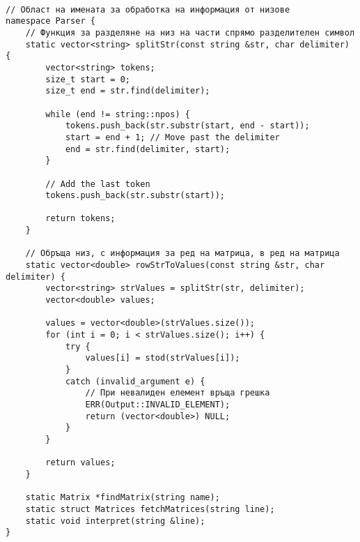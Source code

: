 \documentclass[oneside]{book}
\begin{document}
\pagebreak
\begin{mdframed}\begin{lstlisting}[firstnumber=last]

// Област на имената за обработка на информация от низове
namespace Parser {
	// Функция за разделяне на низ на части спрямо разделителен символ
	static vector<string> splitStr(const string &str, char delimiter) {
		vector<string> tokens;
		size_t start = 0;
		size_t end = str.find(delimiter);

		while (end != string::npos) {
			tokens.push_back(str.substr(start, end - start));
			start = end + 1; // Move past the delimiter
			end = str.find(delimiter, start);
		}

		// Add the last token
		tokens.push_back(str.substr(start));

		return tokens;
	}

	// Обръща низ, с информация за ред на матрица, в ред на матрица
	static vector<double> rowStrToValues(const string &str, char delimiter) {
		vector<string> strValues = splitStr(str, delimiter);
		vector<double> values;

		values = vector<double>(strValues.size());
		for (int i = 0; i < strValues.size(); i++) {
			try {
				values[i] = stod(strValues[i]);
			}
			catch (invalid_argument e) {
				// При невалиден елемент връща грешка
				ERR(Output::INVALID_ELEMENT);
				return (vector<double>) NULL;
			}
		}

		return values;
	}

	static Matrix *findMatrix(string name);
	static struct Matrices fetchMatrices(string line);
	static void interpret(string &line);
}
\end{lstlisting}\end{mdframed}
\pagebreak
\end{document}
